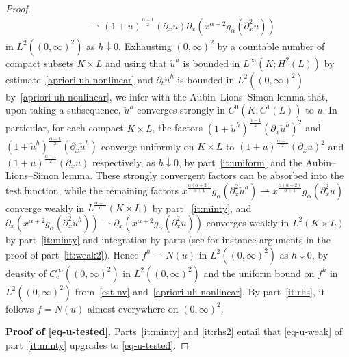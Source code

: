 \documentclass[reqno,12pt]{amsart}
\numberwithin{equation}{section}
\begin{document}
\begin{proof}
\begin{align*}
&\rightharpoonup (1+u)^{\frac{\alpha+1}{2}}
(\partial_x u)
\partial_x(x^{\alpha+2}
g_\alpha(\partial_x^2 u))
\end{align*}
%
in $L^2((0,\infty)^2)$ as $h \downarrow 0$. 
Exhausting
$(0,\infty)^2$ by a countable number of
compact subsets $K \times L$ and using that
$\check u^h$ is bounded in
$L^\infty(K;H^2(L))$ by
estimate~\eqref{apriori-uh-nonlinear}
and $\partial_t \check u^h$ is bounded
in $L^2((0,\infty)^2)$
by~\eqref{apriori-uh-nonlinear},
we infer with the Aubin--Lions--Simon lemma
\cite[Corollary~4]{simon1986compact} that,
upon taking a subsequence, $\check u^h$
converges strongly in $C^0(K;C^1(L))$ to $u$. In particular, for each compact
$K \times L$,
the factors
$(1+\check u^h)^{\frac{\alpha-1}{2}}
(\partial_x \check u^h)^2$
and
$(1+\check u^h)^{\frac{\alpha+1}{2}}
(\partial_x \check u^h)$
converge uniformly on $K \times L$
to
$(1+u)^{\frac{\alpha-1}{2}}
(\partial_x u)^2$
and
$(1+u)^{\frac{\alpha+1}{2}}
(\partial_x u)$
respectively, as $h \downarrow 0$,
by part~\eqref{it:uniform} and the
Aubin--Lions--Simon lemma.
These strongly convergent factors
can be absorbed into the test function,
while the remaining factors
$x^{\frac{\alpha(\alpha+2)}{\alpha+1}}
g_\alpha(\partial_x^2 \check u^h)
\rightharpoonup
x^{\frac{\alpha(\alpha+2)}{\alpha+1}}
g_\alpha(\partial_x^2 u)$
converge weakly in
$L^{\frac{\alpha+1}{\alpha}}(K \times L)$
by part ~\eqref{it:minty}, and 
$\partial_x(x^{\alpha+2}
g_\alpha(\partial_x^2 \check u^h))
\rightharpoonup
\partial_x(x^{\alpha+2}
g_\alpha(\partial_x^2 u))$
converges weakly in $L^2(K \times L)$
by part~\eqref{it:minty}
and integration by parts (see for instance
arguments in the proof of part~\eqref{it:weak2}).
Hence $f^h \rightharpoonup N(u)$
in $L^2((0,\infty)^2)$ as $h \downarrow 0$,
by density of
$C^\infty_\mathrm{c}((0,\infty)^2)$
in $L^2((0,\infty)^2)$ and the uniform
bound on $f^h$ in $L^2((0,\infty)^2)$
from~\eqref{est-nv}
and~\eqref{apriori-uh-nonlinear}.
By part~\eqref{it:rhs}, it follows
$f = N(u)$  almost everywhere
on $(0,\infty)^2$. 

%
\bigskip
%

%
\textbf{Proof of \eqref{eq-u-tested}. }
%
Parts~\eqref{it:minty} and \eqref{it:rhs2} entail that \eqref{eq-u-weak} of part~\eqref{it:minty} upgrades to \eqref{eq-u-tested}.
\end{proof}
%
\end{document}
